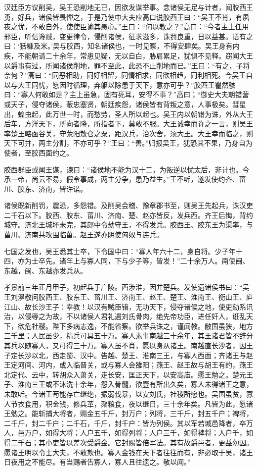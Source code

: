 \documentclass[]{article}
\begin{document}
汉廷臣方议削吴，吴王恐削地无已，因欲发谋举事。念诸侯无足与计者，闻胶西王勇，好兵，诸侯皆畏惮之，于是乃使中大夫应高口说胶西王曰：``吴王不肖，有夙夜之忧，不敢自外，使使臣谕其愚心。''王曰：``何以教之？''高曰：``今者主上任用邪臣，听信谗贼，变更律令，侵削诸侯，征求滋多，诛罚良重，日以益甚。语有之曰：`狧糠及米。'吴与胶西，知名诸侯也，一时见察，不得安肆矣。吴王身有内疾，不能朝请二十余年，常患见疑，无以自白，胁肩累足，犹惧不见释。窃闻大王以爵事有过，所闻诸侯削地，罪不至此，此恐不止削地而已。''王曰：``有之，子将奈何？''高曰：``同恶相助，同好相留，同情相求，同欲相趋，同利相死。今吴王自以与大王同忧，愿因时循理，弃躯以除患于天下，意亦可乎？''胶西王瞿然骇曰：``寡人何敢如是？主上虽急，固有死耳，安得不事？''高曰；``御史大夫朝错营或天子，侵夺诸侯，蔽忠塞贤，朝廷疾怨，诸侯皆有背叛之意，人事极矣。彗星出，蝗虫起，此万世一时，而愁劳，圣人所以起也。吴王内以朝错为诛，外从大王后车，方洋天下，所向者降，所指者下，莫敢不服。大王诚幸而许之一言，则吴王率楚王略函谷关，守荥阳敖仓之粟，距汉兵，治次舍，须大王。大王幸而临之，则天下可并，两主分割，不亦可乎？''王曰：``善。''归报吴王，犹恐其不果，乃身自为使者，至胶西面约之。

胶西群臣或闻王谋，谏曰：``诸侯地不能为汉十二，为叛逆以忧太后，非计也。今承一帝，尚云不易，假令事成，两主分争，患乃益生。''王不听，遂发使约齐、菑川、胶东、济南，皆许诺。

诸侯既新削罚，震恐，多怨错。及削吴会稽、豫章郡书至，则吴王先起兵，诛汉吏二千石以下。胶西、胶东、菑川、济南、楚、赵亦皆反，发兵西。齐王后悔，背约城守。济北王城坏未完，其郎中令劫守王，不得发兵。胶西王、胶东王为渠率，与菑川、济南共攻围临菑。赵王遂亦阴使匈奴与连兵。

七国之发也，吴王悉其士卒，下令国中曰：``寡人年六十二，身自将。少子年十四，亦为士卒先。诸年上与寡人同，下与少子等，皆发！''二十余万人。南使闽、东越，闽、东越亦发兵从。

孝景前三年正月甲子，初起兵于广陵。西涉淮，因并楚兵。发使遗诸侯书曰：``吴王刘濞敬问胶西王、胶东王、菑川王、济南王、赵王、楚王、淮南王、衡山王、庐江山、故长沙王子：幸教！以汉有贼臣错，无功天下，侵夺诸侯之地，使吏劾系讯治，以侵辱之为故，不以诸侯人君礼遇刘氏骨肉，绝先帝功臣，进任奸人，诳乱天下，欲危社稷。陛下多病志逸，不能省察。欲举兵诛之，谨闻教。敝国虽狭，地方三千里；人民虽少，精兵可具五十万。寡人素事南越三十余年，其王诸君皆不辞分其兵以随寡人，又可得三十万。寡人虽不肖，愿以身从诸王。南越直长沙者，因王子定长沙以北，西走蜀、汉中。告越、楚王、淮南三王，与寡人西面；齐诸王与赵王定河间、河内，或入临晋关，或与寡人会雒阳；燕王、赵王故与胡王有约，燕王北定代、云中，转胡众入萧关，走长安，匡正天下，以安高庙。愿王勉之。楚元王子、淮南三王或不沐洗十余年，怨入骨髓，欲壹有所出久矣，寡人未得诸王之意，未敢听。今诸王苟能存亡继绝，振弱伐暴，以安刘氏，社稷所愿也。吴国虽贫，寡人节衣食用，积金钱，修兵革，聚粮食，夜以继日，三十余年矣。凡皆为此，愿诸王勉之。能斩捕大将者，赐金五千斤，封万户；列将，三千斤，封五千户；裨将，二千斤，封二千户；二千石，千斤，封千户：皆为列侯。其以军若城邑降者，卒万人，邑万户，如得大将；人户五千，如得列将；人户三千，如得裨将；人户千，如得二千石；其小吏皆以差次受爵金。它封赐皆倍军法。其有故爵邑者，更益勿因。愿诸王明以令士大夫，不敢欺也。寡人金钱在天下者往往而有，非必取于吴，诸王日夜用之不能尽。有当赐者告寡人，寡人且往遗之。敬以闻。''
\end{document}
